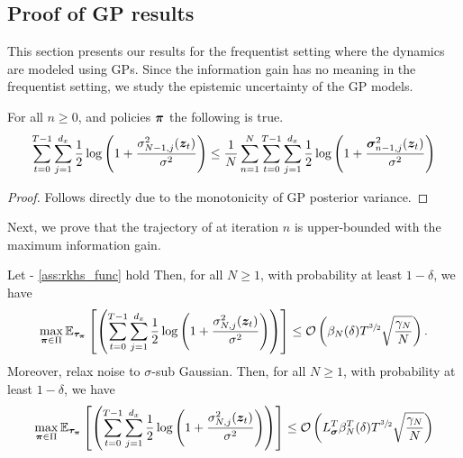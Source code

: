 \subsection{Proof of GP results}
This section presents our results for the frequentist setting where the dynamics are modeled using GPs. Since the information gain has no meaning in the frequentist setting, we study the epistemic uncertainty of the GP models.
\begin{corollary}
For all $n \geq 0$, and policies ${\bm{\pi}}$ the following is true.
\begin{equation*}
    \sum_{t=0}^{T-1} \sum_{j=1}^{d_x}  \frac{1}{2} \log \left(1 + \frac{\sigma_{N-1, j}^2({\bm{z}}_{t})}{\sigma^2}\right)  \leq \frac{1}{N}\sum^{N}_{n=1} \sum_{t=0}^{T-1} \sum_{j=1}^{d_x}  \frac{1}{2} \log \left(1 + \frac{{\bm{\sigma}}_{n-1, j}^2({\bm{z}}_{t})}{\sigma^2}\right)
\end{equation*}
\label{cor:monotonocity_of_variance}
\end{corollary}
\begin{proof}
    Follows directly due to the monotonicity of GP posterior variance.
\end{proof}
Next, we prove that the trajectory of  at iteration $n$ is upper-bounded with the maximum information gain.
\begin{lemma}
    Let  - \ref{ass:rkhs_func} hold Then, for all $N \geq 1$, with probability at least $1-\delta$, we have
    \begin{equation*}
    \max_{{\bm{\pi}} \in \Pi} \mathbb{E}_{{\bm{\tau}}_{{\bm{\pi}}}}\left[\left(\sum_{t=0}^{T-1} \sum^{d_x}_{j=1}\frac{1}{2} \log \left(1 + \frac{\sigma_{N, j}^2({\bm{z}}_{t})}{\sigma^2}\right)\right)\right] \leq {\mathcal{O}} \left(\beta_{N}(\delta) T^{\sfrac{3}{2}}\sqrt{\frac{\gamma_N}{N}}\right).
\end{equation*}
Moreover, relax noise  to $\sigma$-sub Gaussian. 
Then, for all $N \geq 1$, with probability at least $1-\delta$, we have
\begin{equation*}
    \max_{{\bm{\pi}} \in \Pi} \mathbb{E}_{{\bm{\tau}}_{{\bm{\pi}}}}\left[\left(\sum_{t=0}^{T-1} \sum^{d_x}_{j=1}\frac{1}{2} \log \left(1 + \frac{\sigma_{N, j}^2({\bm{z}}_{t})}{\sigma^2}\right)\right)\right] \leq {\mathcal{O}} \left(L^{T}_{{\bm{\sigma}}} \beta^{T}_{N}(\delta) T^{\sfrac{3}{2}}\sqrt{\frac{\gamma_N}{N}}\right)
\end{equation*}
\label{lem:Gp_bound_general}
\end{lemma}
